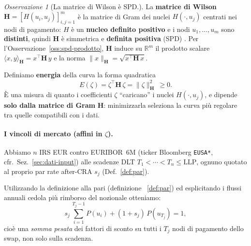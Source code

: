 \documentclass[11pt,a4paper]{article}
\theoremstyle{plain}
\theoremstyle{definition}
\theoremstyle{remark}
\newtheorem*{osservazione}{Osservazione}
\newcommand{\LLP}{\ensuremath{\mathrm{LLP}}}
\newcommand{\Hmat}{\mathbf{H}}
\newcommand{\transp}{^{\!\top}}
\begin{document}
\begin{osservazione}[La matrice di Wilson \`e SPD.]
\label{oss:energia}
La \textbf{matrice di Wilson} $\Hmat = [H(u_i,u_j)]_{i,j=1}^{m}$ \`e la matrice di Gram
dei nuclei $H(\cdot,u_j)$ centrati nei nodi di pagamento: $H$ \`e un \textbf{nucleo definito
positivo} e i nodi $u_1,\ldots,u_m$ sono \textbf{distinti}, quindi $\Hmat$ \`e simmetrica e
\textbf{definita positiva} (SPD) \cite{fasshauer2007,lageras2016}.
Per l'Osservazione~\ref{oss:spd-prodotto}, $\Hmat$ induce su $\mathbb{R}^m$ il prodotto
scalare $\langle x,y\rangle_{\Hmat} = x\transp\Hmat\,y$ e la norma $\|x\|_{\Hmat} = \sqrt{x\transp\Hmat\,x}$.

Definiamo \textbf{energia} della curva la forma quadratica
\[
  E(\zeta) = \zeta\transp \Hmat\, \zeta = \|\zeta\|_{\Hmat}^2 \ \ge 0 .
\]
\`E una misura di quanto i coefficienti $\zeta$ ``caricano'' i nuclei $H(\cdot,u_j)$,
e dipende \textbf{solo dalla matrice di Gram} $\Hmat$: minimizzarla seleziona la curva
pi\`u regolare tra quelle compatibili con i dati.%
\end{osservazione}

\paragraph{I vincoli di mercato (affini in $\zeta$).}
Abbiamo $n$ IRS EUR contro EURIBOR~6M (ticker Bloomberg \texttt{EUSA*},
cfr.~Sez.~\ref{sec:dati-input}) alle scadenze DLT $T_1<\cdots<T_n\le\LLP$, ognuno quotato al
proprio par rate after-CRA $s_j$ (Def.~\ref{def:par}).

Utilizzando la definizione alla pari (definizione ~\ref{def:par}) ed esplicitando i flussi
annuali cedola più rimborso del nozionale otteniamo:
\[
  s_j\,\sum_{i=1}^{T_j-1} P(u_i) + (1+s_j)\,P(u_{T_j}) = 1,
\]
cio\`e una \emph{somma pesata} dei fattori di sconto su tutti i $T_j$ nodi di pagamento dello
swap, non solo sulla scadenza.
\end{document}
